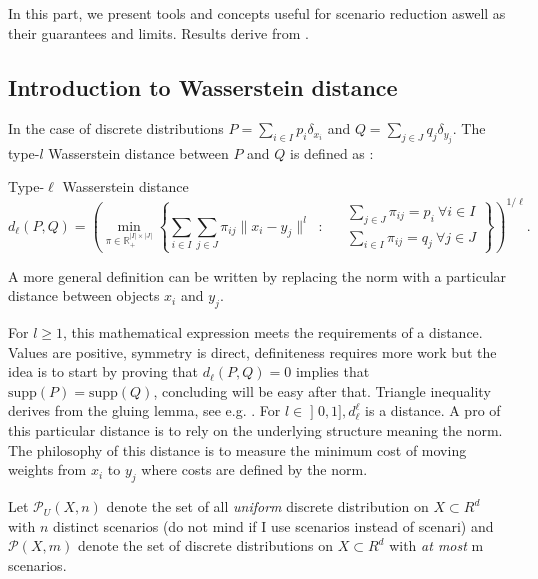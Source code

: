 \documentclass{amsart}
\begin{document}
In this part, we present tools and concepts useful for scenario reduction aswell as their guarantees and limits. Results derive from \cite{rujeerapaiboon_scenario_2022}. 

\subsection{Introduction to Wasserstein distance}
In the case of discrete distributions $P=\sum_{i\in I}p_i\delta_{x_i}$ and $Q=\sum_{j\in J}q_j\delta_{y_j}$. The type-$l$ Wasserstein distance between $P$ and $Q$ is defined as :  
\begin{definition}{Type-$\ell$ Wasserstein distance}
$$
d_\ell(P,Q)=\left(\min_{\pi\in\mathbb{R}_+^{\lvert I\rvert\times\lvert J\rvert}}\left\{ 
\sum_{i\in I}\sum_{j\in J}\pi_{ij}\lVert x_i-y_j\rVert^l \: \text{ : } \:  \begin{aligned}
& \sum_{j\in J}\pi_{ij}=p_i \: \forall i\in I \\
& \sum_{i\in I}\pi_{ij}=q_j \: \forall j\in J
\end{aligned}\right\}\right)^{1/\ell}.
$$
\end{definition}

\begin{remark}
    A more general definition can be written by replacing the norm with a particular distance between objects $x_i$ and $y_j$. 
\end{remark}
For $l\geq1$, this mathematical expression meets the requirements of a distance. Values are positive, symmetry is direct, definiteness requires more work but the idea is to start by proving that $d_\ell\left(P,Q\right)=0$ implies that $\text{supp}\left(P\right)=\text{supp}\left(Q\right)$, concluding will be easy after that. Triangle inequality derives from the gluing lemma, see e.g. \cite[Chapter 1]{peyre_computational_2019}. For $l\in\mathopen{]}0,1\mathclose{]}, d_\ell^\ell$ is a distance. A pro of this particular distance is to rely on the underlying structure meaning the norm. The philosophy of this distance is to measure the minimum cost of moving weights from $x_i$ to $y_j$ where costs are defined by the norm.
\newline

Let $\mathcal{P}_U(X,n)$ denote the set of all \emph{uniform} discrete distribution on $X\subset R^d$ with $n$ distinct scenarios (do not mind if I use scenarios instead of scenari) and $\mathcal{P}(X,m)$ denote the set of discrete distributions on $X\subset R^d$ with \emph{at most} m scenarios. 
\newline
\end{document}
